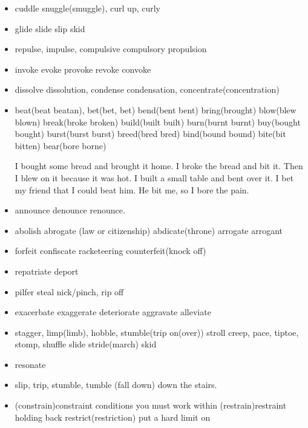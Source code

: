 \documentclass[a4paper,11pt,twoside]{book}
\begin{document}
\begin{itemize}
	\item cuddle snuggle(smuggle), curl up, curly 
	
	\item glide slide slip skid 
	
	\item repulse, impulse, compulsive compulsory propulsion
	
	\item invoke evoke provoke revoke convoke
	
	\item dissolve dissolution, condense condensation, concentrate(concentration)
	
	\item beat(beat beatan), bet(bet, bet) bend(bent bent) bring(brought) blow(blew blown) break(broke broken) build(built built) burn(burnt burnt) buy(bought bought) burst(burst burst) breed(bred bred) bind(bound bound) 
	bite(bit bitten) bear(bore borne)
	
	I bought some bread and brought it home.
	I broke the bread and bit it.
	Then I blew on it because it was hot.
	I built a small table and bent over it.
	I bet my friend that I could beat him.
	He bit me, so I bore the pain. 
	
	\item announce denounce renounce. 
	
	\item abolish abrogate (law or citizenship) abdicate(throne) arrogate arrogant
	
	\item forfeit confiscate racketeering counterfeit(knock off)
	
	\item repatriate deport
	
	\item pilfer steal nick/pinch, rip off 
	
	\item exacerbate exaggerate deteriorate aggravate alleviate 
	
	\item stagger, limp(limb), hobble, stumble(trip on(over)) stroll creep, pace, tiptoe, stomp, shuffle
	slide stride(march) skid

	\item resonate
	
	\item slip, trip, stumble,  tumble (fall down) down the stairs. 
	
	\item (constrain)constraint conditions you must work within 
	(restrain)restraint holding back
	restrict(restriction) put a hard limit on
	

\end{itemize}
\end{document}
